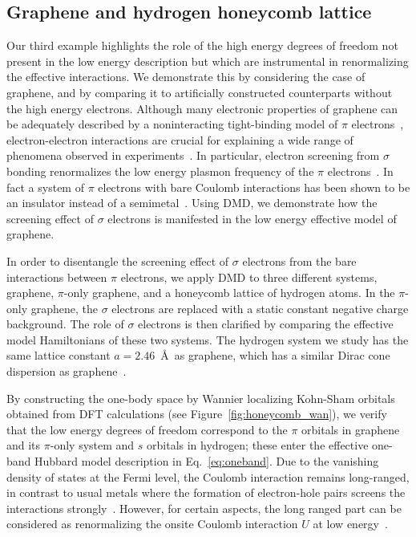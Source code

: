 \documentclass[aps, prb, 11pt]{revtex4-1}
\begin{document}
\subsection{Graphene and hydrogen honeycomb lattice}
\label{subsection:graphene}
Our third example highlights the role of the high energy 
degrees of freedom not present in the low energy description 
but which are instrumental in renormalizing the effective interactions. 
We demonstrate this by considering the case of graphene, and by 
comparing it to artificially constructed counterparts without the high energy electrons. 
Although many electronic properties of graphene can be adequately 
described by a noninteracting tight-binding model of $\pi$ electrons~\cite{Castro2009}, 
electron-electron interactions are crucial for explaining 
a wide range of phenomena observed in experiments~\cite{Kotov2012}. 
In particular, electron screening from $\sigma$ bonding renormalizes 
the low energy plasmon frequency of the $\pi$ electrons~\cite{Zheng2016}. 
In fact a system of $\pi$ electrons with bare Coulomb interactions has been shown to be an insulator instead of a semimetal~\cite{DrutPRL2009, DrutPRB2009,  Smith2014, Zheng2016}. 
Using DMD, we demonstrate how the screening effect of $\sigma$ electrons is manifested in the low energy effective model of graphene. 

In order to disentangle the screening effect of $\sigma$ electrons from the bare interactions 
between $\pi$ electrons, we apply DMD to three different systems, graphene, $\pi$-only graphene, and a honeycomb lattice of hydrogen atoms.  
In the $\pi$-only graphene, the 
$\sigma$ electrons are replaced with a static constant negative charge background. 
The role of $\sigma$ electrons is then clarified by comparing the effective model Hamiltonians of these two systems. 
The hydrogen system we study has the same lattice constant $a=2.46$~\AA~as graphene, 
which has a similar Dirac cone dispersion as graphene~\cite{Zheng2016}. 

By constructing the one-body space by Wannier localizing Kohn-Sham orbitals obtained from DFT calculations (see Figure~\ref{fig:honeycomb_wan}), 
we verify that the low energy degrees of freedom correspond to the $\pi$ orbitals in graphene and 
its $\pi$-only system and $s$ orbitals in hydrogen; these enter the effective one-band Hubbard model description in Eq.~\eqref{eq:oneband}. 
Due to the vanishing density of states at the Fermi level, the Coulomb interaction remains long-ranged, 
in contrast to usual metals where the formation of electron-hole pairs screens the interactions strongly~\cite{Zheng2016}. 
However, for certain aspects, the long ranged part can be considered as renormalizing the 
onsite Coulomb interaction $U$ at low energy~\cite{Schuler2013, Changlani2015}. 
\end{document}
